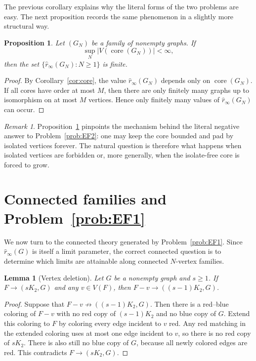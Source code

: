 \documentclass[11pt]{article}
\newcommand{\sri}{\hat r_{\infty}}
\newcommand{\core}{\operatorname{core}}
\newtheorem{proposition}[theorem]{Proposition}
\newtheorem{lemma}[theorem]{Lemma}
\theoremstyle{definition}
\theoremstyle{remark}
\newtheorem{remark}[theorem]{Remark}
\begin{document}
The previous corollary explains why the literal forms of the two problems are easy. The
next proposition records the same phenomenon in a slightly more structural way.

\begin{proposition}\label{prop:bounded-core}
Let $(G_N)$ be a family of nonempty graphs. If
\[
\sup_N |V(\core(G_N))|<\infty,
\]
then the set
$\{\sri(G_N):N\ge 1\}$
is finite.
\end{proposition}

\begin{proof}
By Corollary~\ref{cor:core}, the value $\sri(G_N)$ depends only on $\core(G_N)$. If all
cores have order at most $M$, then there are only finitely many graphs up to isomorphism on
at most $M$ vertices. Hence only finitely many values of $\sri(G_N)$ can occur.
\end{proof}

\begin{remark}
Proposition~\ref{prop:bounded-core} pinpoints the mechanism behind the literal negative
answer to Problem~\ref{prob:EF2}: one may keep the core bounded and pad by isolated
vertices forever. The natural question is therefore what happens when isolated vertices are
forbidden or, more generally, when the isolate-free core is forced to grow.
\end{remark}

\section{Connected families and Problem~\ref{prob:EF1}}

We now turn to the connected theory generated by Problem~\ref{prob:EF1}. Since
$\sri(G)$ is itself a limit parameter, the correct connected question is to determine which
limits are attainable along connected $N$-vertex families.

\begin{lemma}[Vertex deletion]\label{lem:delete-one}
Let $G$ be a nonempty graph and $s\ge 1$. If
$F\to(sK_2,G)$
and any $v\in V(F)$, then
$F-v\to((s-1)K_2,G)$.
\end{lemma}

\begin{proof}
Suppose that $F-v\not\to((s-1)K_2,G)$. Then there is a red--blue coloring of $F-v$ with
no red copy of $(s-1)K_2$ and no blue copy of $G$. Extend this coloring to $F$ by coloring
every edge incident to $v$ red. Any red matching in the extended coloring uses at most one
edge incident to $v$, so there is no red copy of $sK_2$. There is also still no blue copy of
$G$, because all newly colored edges are red. This contradicts $F\to(sK_2,G)$.
\end{proof}
\end{document}
